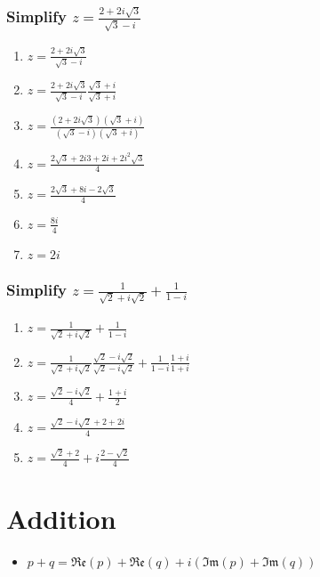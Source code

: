 \documentclass{report}
\newcommand{\re}[1]{\mathfrak{Re}(#1)}
\newcommand{\im}[1]{\mathfrak{Im}(#1)}
\begin{document}
                \subsubsection{Simplify $z=\frac{2+2i\sqrt{3}}{\sqrt{3}-i}$}
                    \begin{enumerate}
                        \item $z=\frac{2+2i\sqrt{3}}{\sqrt{3}-i}$
                        \item $z=\frac{2+2i\sqrt{3}}{\sqrt{3}-i}\frac{\sqrt{3}+i}{\sqrt{3}+i}$
                        \item $z=\frac{(2+2i\sqrt{3})(\sqrt{3}+i)}{(\sqrt{3}-i)(\sqrt{3}+i)}$
                        \item $z=\frac{2\sqrt{3}+2i3+2i+2i^2\sqrt{3}}{4}$
                        \item $z=\frac{2\sqrt{3}+8i-2\sqrt{3}}{4}$
                        \item $z=\frac{8i}{4}$
                        \item $z=2i$
                    \end{enumerate}
                \subsubsection{Simplify $z=\frac{1}{\sqrt{2}+i\sqrt{2}}+\frac{1}{1-i}$}
                    \begin{enumerate}
                        \item $z=\frac{1}{\sqrt{2}+i\sqrt{2}}+\frac{1}{1-i}$
                        \item $z=\frac{1}{\sqrt{2}+i\sqrt{2}}\frac{\sqrt{2}-i\sqrt{2}}{\sqrt{2}-i\sqrt{2}}+\frac{1}{1-i}\frac{1+i}{1+i}$
                        \item $z=\frac{\sqrt{2}-i\sqrt{2}}{4}+\frac{1+i}{2}$
                        \item $z=\frac{\sqrt{2}-i\sqrt{2}+2+2i}{4}$
                        \item $z=\frac{\sqrt{2}+2}{4}+i\frac{2-\sqrt{2}}{4}$
                    \end{enumerate}
        \section{Addition}
            \begin{itemize}
                \item $p+q=\re{p}+\re{q}+i(\im{p}+\im{q})$
            \end{itemize}
\end{document}
